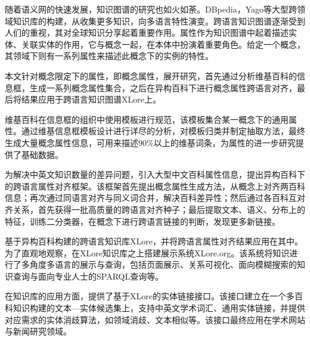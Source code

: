 \begin{cabstract}
随着语义网的快速发展，知识图谱的研究也如火如荼。DBpedia，Yago等大型跨领域知识库的构建，从收集更多知识，向多语言特性演变。跨语言知识图谱逐渐受到人们的重视，其对全球知识分享起着重要作用。属性作为知识图谱中起着描述实体、关联实体的作用，它与概念一起，在本体中扮演着重要角色。给定一个概念，其领域下则有一系列属性来描述此概念下的实例的特性。

本文针对概念限定下的属性，即概念属性，展开研究，首先通过分析维基百科的信息框，生成一系列概念属性集合，之后在异构百科下进行概念属性跨语言对齐，最后将结果应用于跨语言知识图谱XLore上。

维基百科在信息框的组织中使用模板进行规范，该模板集合某一概念下的通用属性。通过维基信息框模板设计进行详尽的分析，对模板归类并制定抽取方法，最终生成大量概念属性信息，可用来描述90\%以上的维基词条，为属性的进一步研究提供了基础数据。

为解决中英文知识数量的差异问题，引入大型中文百科属性信息，提出异构百科下的跨语言属性对齐框架。该框架首先提出概念属性生成方法，从概念上对齐两百科信息；再次通过同语言对齐与同义词合并，解决百科差异性；然后通过各百科互对齐关系，首先获得一批高质量的跨语言对齐种子；最后提取文本、语义、分布上的特征，训练二分类器，在概念下进行跨语言链接的判断，发现更多新链接。

基于异构百科构建的跨语言知识库XLore，并将跨语言属性对齐结果应用在其中。为了直观地观察，在XLore知识库之上搭建展示系统XLore.org。该系统将知识进行了多角度多语言的展示与查询，包括页面展示、关系可视化、面向模糊搜索的知识查询与面向专业人士的SPARQL查询等。

在知识库的应用方面，提供了基于XLore的实体链接接口。该接口建立在一个多百科知识构建的文本—实体候选集上，支持中英文学术词汇、通用实体链接，并提供对应需求的实体消歧算法，如领域消歧、文本相似等。该接口最终应用在学术网站与新闻研究领域。

\end{cabstract}


\begin{eabstract}
\end{eabstract}


